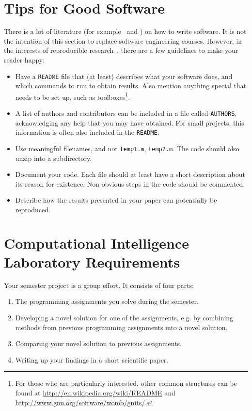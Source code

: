 \documentclass[10pt,conference,compsocconf]{IEEEtran}
\begin{document}
\section{Tips for Good Software}
\label{sec:tips-software}

There is a lot of literature (for example~\cite{hunt99pragmatic} and
\cite{spolsky04software}) on how to write software. It is not the
intention of this section to replace software engineering
courses. However, in the interests of reproducible
research~\cite{schwab00}, there are a few guidelines to make your
reader happy:
\begin{itemize}
\item Have a \texttt{README} file that (at least) describes what your
  software does, and which commands to run to obtain results. Also
  mention anything special that needs to be set up, such as
  toolboxes\footnote{For those who are
  particularly interested, other common structures can be found at
  \url{http://en.wikipedia.org/wiki/README} and
  \url{http://www.gnu.org/software/womb/gnits/}.}.
\item A list of authors and contributors can be included in a file
  called \texttt{AUTHORS}, acknowledging any help that you may have
  obtained. For small projects, this information is often also
  included in the \texttt{README}.
\item Use meaningful filenames, and not \texttt{temp1.m},
  \texttt{temp2.m}. The code should also unzip into a subdirectory.
\item Document your code. Each file should at least have a short
  description about its reason for existence. Non obvious steps in the
  code should be commented.
\item Describe how the results presented in your paper can potentially
  be reproduced.
\end{itemize}


\section{Computational Intelligence Laboratory Requirements}
\label{sec:cil}

Your semester project is a group effort. It consists of four parts:
\begin{enumerate}
\item The programming assignments you solve during the semester.
\item Developing a novel solution for one of the assignments, e.g. by
  combining methods from previous programming assignments into a novel
  solution.
\item Comparing your novel solution to previous assignments.
\item Writing up your findings in a short scientific paper.
\end{enumerate}
\end{document}
